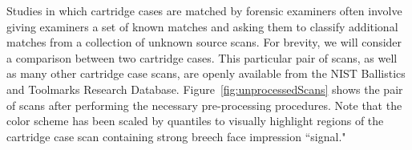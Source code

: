 Studies in which cartridge cases are matched by forensic examiners often involve giving examiners a set of known matches and asking them to classify additional matches from a collection of unknown source scans. For brevity, we will consider a comparison between two cartridge cases. This particular pair of scans, as well as many other cartridge case scans, are openly available from the NIST Ballistics and Toolmarks Research Database. Figure~\ref{fig:unprocessedScans} shows the pair of scans after performing the necessary pre-processing procedures. Note that the color scheme has been scaled by quantiles to visually highlight regions of the cartridge case scan containing strong breech face impression ``signal."


